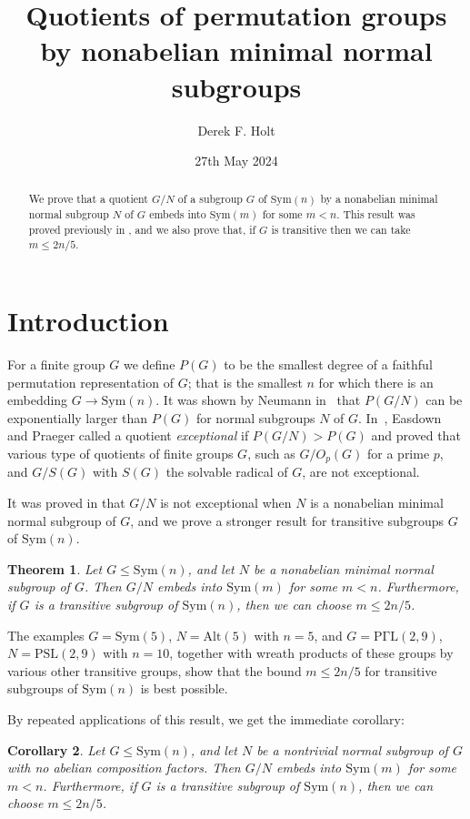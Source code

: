 \documentclass[12pt,a4paper]{article}
\date{27th May 2024}
\title{Quotients of permutation groups by nonabelian minimal normal subgroups}
\author{Derek F. Holt}
\newcommand{\Sym}{\mathrm{Sym}}
\newcommand{\Alt}{\mathrm{Alt}}
\newcommand{\PSL}{\mathrm{PSL}}
\newcommand{\PGamL}{\mathrm{P \Gamma L}}
\newtheorem{theorem}{Theorem}[section] %
\newtheorem{corollary}[theorem]{Corollary}
\begin{document}
\maketitle
\begin{abstract}
We prove that a quotient $G/N$ of a subgroup $G$ of $\Sym(n)$ by a nonabelian
minimal normal subgroup $N$ of $G$ embeds into $\Sym(m)$ for some $m<n$.
This result was proved previously in \cite{Chamberlain}, and we also prove
that, if $G$ is transitive then we can take $m \le 2n/5$.
\end{abstract}

\section{Introduction}
For a finite group $G$ we define $P(G)$ to be the smallest degree of a
faithful permutation representation of $G$; that is the smallest $n$ for which
there is an embedding $G \to \Sym(n)$. It was shown by Neumann in~\cite{Neu}
that $P(G/N)$ can be exponentially larger than $P(G)$ for normal
subgroups $N$ of $G$. In~\cite{EP}, Easdown and Praeger called
a quotient \emph{exceptional} if $P(G/N) > P(G)$ and proved that
various type of quotients of finite groups $G$, such as $G/O_p(G)$ for
a prime $p$, and $G/S(G)$ with $S(G)$ the solvable radical of $G$,
are not exceptional.

It was proved in \cite{Chamberlain} that $G/N$ is not exceptional when $N$ is
a nonabelian minimal normal subgroup of $G$, and we prove a stronger result for
transitive subgroups $G$ of $\Sym(n)$.

\begin{theorem}\label{thm:main}
Let $G \le \Sym(n)$, and let $N$ be a nonabelian minimal normal subgroup of $G$.
Then $G/N$ embeds into $\Sym(m)$ for some $m<n$.
Furthermore, if $G$ is a transitive subgroup of $\Sym(n)$, then
we can choose $m \le 2n/5$.
\end{theorem}

The examples $G=\Sym(5)$, $N=\Alt(5)$  with $n=5$, and $G=\PGamL(2,9)$,
$N=\PSL(2,9)$ with $n=10$, together with
wreath products of these groups by various other transitive groups, show that
the bound $m \le 2n/5$ for transitive subgroups of $\Sym(n)$ is best possible.

By repeated applications of this result, we get the immediate corollary:
\begin{corollary}\label{cor:main}
Let $G \le \Sym(n)$, and let $N$ be a nontrivial normal subgroup of $G$ with
no abelian composition factors. Then $G/N$ embeds into $\Sym(m)$ for some $m<n$.
Furthermore, if $G$ is a transitive subgroup of $\Sym(n)$, then
we can choose $m \le 2n/5$.
\end{corollary}
\end{document}

